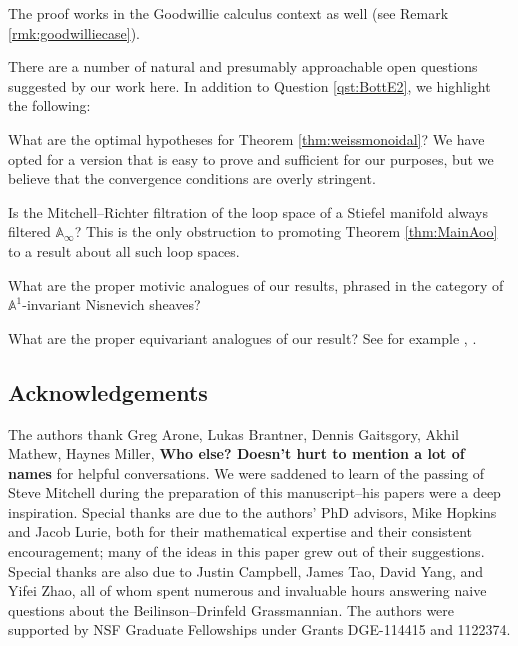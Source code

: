 The proof works in the Goodwillie calculus context as well (see Remark \ref{rmk:goodwilliecase}).  

There are a number of natural and presumably approachable open questions suggested by our work here.  In addition to Question \ref{qst:BottE2}, we highlight the following:

\begin{qst}
What are the optimal hypotheses for Theorem \ref{thm:weissmonoidal}?  We have opted for a version that is easy to prove and sufficient for our purposes, but we believe that the convergence conditions are overly stringent.  
\end{qst}

\begin{qst}
Is the Mitchell--Richter filtration of the loop space of a Stiefel manifold always filtered $\mathbb{A}_\infty$?  This is the only obstruction to promoting Theorem \ref{thm:MainAoo} to a result about all such loop spaces.
\end{qst}

\begin{qst}
What are the proper motivic analogues of our results, phrased in the category of $\mathbb{A}^1$-invariant Nisnevich sheaves?
\end{qst}

\begin{qst}
What are the proper equivariant analogues of our result?  See for example \cite{Ullman}, \cite{Tynan}.
\end{qst}

\subsection*{Acknowledgements}
The authors thank Greg Arone, Lukas Brantner, Dennis Gaitsgory, Akhil Mathew, Haynes Miller, \textbf{Who else?  Doesn't hurt to mention a lot of names} for helpful conversations.  We were saddened to learn of the passing of Steve Mitchell during the preparation of this manuscript--his papers were a deep inspiration.  Special thanks are due to the authors' PhD advisors, Mike Hopkins and Jacob Lurie, both for their mathematical expertise and their consistent encouragement; many of the ideas in this paper grew out of their suggestions.  Special thanks are also due to Justin Campbell, James Tao, David Yang, and Yifei Zhao, all of whom spent numerous and invaluable hours answering naive questions about the Beilinson--Drinfeld Grassmannian.  The authors were supported by NSF Graduate Fellowships under Grants DGE-114415 and 1122374.

